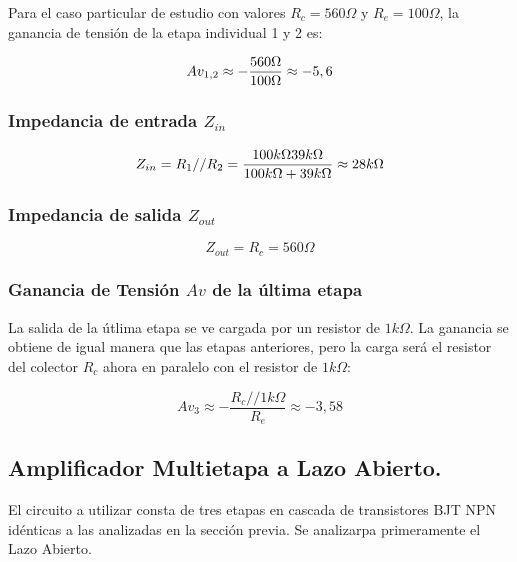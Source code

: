 \documentclass[letterpaper, 10 pt, conference]{ieeeconf}  %
\begin{document}
Para el caso particular de estudio con valores $R_c = 560\Omega$ y $R_e = 100\Omega$, la ganancia de tensión de la etapa individual 1 y 2 es:

\begin{equation}
Av_{1,2} \approx -\frac{560\Omega}{100\Omega} \approx -5,6 \\[1em]
\end{equation}

\subsubsection{Impedancia de entrada $Z_{in}$}

\begin{equation}
\\[1em]Z_{in} = R_1//R_2 = \frac{100k\Omega 39k\Omega}{100k\Omega + 39k\Omega} \approx 28k\Omega
\label{eq:zin_individual}
\end{equation}

\subsubsection{Impedancia de salida $Z_{out}$}

\begin{equation}
Z_{out} = R_c = 560\Omega
\label{eq:zout_individual}
\end{equation}

\subsubsection{Ganancia de Tensión $Av$ de la última etapa}
La salida de la útlima etapa se ve cargada por un resistor de $1k\Omega$. La ganancia se obtiene de igual manera que las etapas anteriores, pero la carga será el resistor del colector $R_c$ ahora en paralelo con el resistor de $1k\Omega$:

\begin{equation}
Av_3 \approx -\frac{R_c//1k\Omega}{R_e} \approx -3,58
\end{equation}

\subsection{\textbf{Amplificador Multietapa a Lazo Abierto.}}
El circuito a utilizar consta de tres etapas en cascada de transistores BJT NPN idénticas a las analizadas en la sección previa. Se analizarpa primeramente el Lazo Abierto.\\
\end{document}
